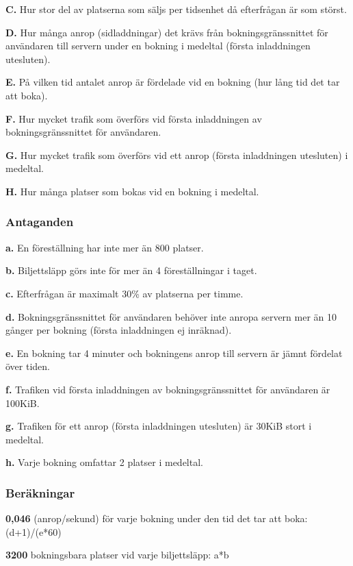 \documentclass[a4paper, twoside, 11pt, titlepage]{article}
\begin{document}
		\textbf{C.} Hur stor del av platserna som säljs per tidsenhet då efterfrågan är som störst.

		\textbf{D.} Hur många anrop (sidladdningar) det krävs från bokningsgränssnittet för användaren till servern under en bokning i medeltal (första inladdningen utesluten).

		\textbf{E.} På vilken tid antalet anrop är fördelade vid en bokning (hur lång tid det tar att boka).

		\textbf{F.} Hur mycket trafik som överförs vid första inladdningen av bokningsgränssnittet för användaren.

		\textbf{G.} Hur mycket trafik som överförs vid ett anrop (första inladdningen utesluten) i medeltal.

		\textbf{H.} Hur många platser som bokas vid en bokning i medeltal.

		\subsubsection{Antaganden}


		\textbf{a.} En föreställning har inte mer än 800 platser.

		\textbf{b.} Biljettsläpp görs inte för mer än 4 föreställningar i taget.

		\textbf{c.} Efterfrågan är maximalt 30\% av platserna per timme.

		\textbf{d.} Bokningsgränssnittet för användaren behöver inte anropa servern mer än 10 gånger per bokning (första inladdningen ej inräknad).

		\textbf{e.} En bokning tar 4 minuter och bokningens anrop till servern är jämnt fördelat över tiden. 

		\textbf{f.} Trafiken vid första inladdningen av bokningsgränssnittet för användaren är 100KiB.

		\textbf{g.} Trafiken för ett anrop (första inladdningen utesluten) är 30KiB stort i medeltal. 

		\textbf{h.} Varje bokning omfattar 2 platser i medeltal.

		\subsubsection{Beräkningar}


		\textbf{0,046} (anrop/sekund) för varje bokning under den tid det tar att boka: (d+1)/(e*60)

		\textbf{3200} bokningsbara platser vid varje biljettsläpp: a*b
\end{document}
